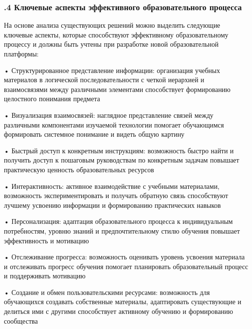 \subtitlespace

\subsubsection*{ 
  \gostTitleFont
  .4 Ключевые аспекты эффективного образовательного процесса
} 

\subtitlespace

{\gostFont
  
  \par \redline На основе анализа существующих решений можно выделить следующие ключевые аспекты, которые способствуют эффективному образовательному процессу и должны быть учтены при разработке новой образовательной платформы:
  
  \par \redline • Структурированное представление информации: организация учебных материалов в логической последовательности с четкой иерархией и взаимосвязями между различными элементами способствует формированию целостного понимания предмета
  
  \par \redline • Визуализация взаимосвязей: наглядное представление связей между различными компонентами изучаемой технологии помогает обучающимся формировать системное понимание и видеть общую картину
  
  \par \redline • Быстрый доступ к конкретным инструкциям: возможность быстро найти и получить доступ к пошаговым руководствам по конкретным задачам повышает практическую ценность образовательных ресурсов
  
  \par \redline • Интерактивность: активное взаимодействие с учебными материалами, возможность экспериментировать и получать обратную связь способствуют лучшему усвоению информации и формированию практических навыков
  
  \par \redline • Персонализация: адаптация образовательного процесса к индивидуальным потребностям, уровню знаний и предпочтительному стилю обучения повышает эффективность и мотивацию
  
  \par \redline • Отслеживание прогресса: возможность оценивать уровень усвоения материала и отслеживать прогресс обучения помогает планировать образовательный процесс и поддерживать мотивацию
  
  \par \redline • Создание и обмен пользовательскими ресурсами: возможность для обучающихся создавать собственные материалы, адаптировать существующие и делиться ими с другими способствует активному обучению и формированию сообщества
  
}
